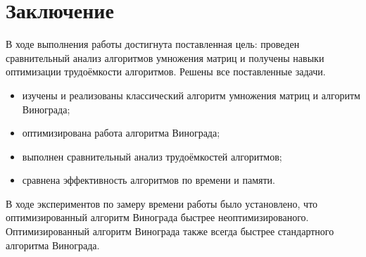 	\chapter*{Заключение}
В ходе выполнения работы достигнута поставленная цель: проведен сравнительный
анализ алгоритмов умножения матриц и получены навыки оптимизации трудоёмкости алгоритмов. Решены все поставленные задачи.
\begin{itemize}
	\item изучены и реализованы классический алгоритм умножения матриц и алгоритм Винограда;
	\item оптимизирована работа алгоритма Винограда;
	\item выполнен сравнительный анализ трудоёмкостей алгоритмов;
	\item сравнена эффективность алгоритмов по времени и памяти.
\end{itemize}

В ходе экспериментов по замеру времени работы было установлено, что оптимизированный алгоритм Винограда быстрее неоптимизированого. Оптимизированный алгоритм Винограда также всегда быстрее стандартного алгоритма Винограда.
\newpage
